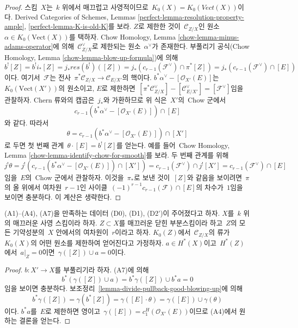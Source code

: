 \begin{proof}
스킴\  $X$는\  $k$ 위에서 매끄럽고 사영적이므로\ 
$K_0(X) = K_0(\textit{Vect}(X))$이다. Derived Categories of Schemes,
Lemmas \ref{perfect-lemma-resolution-property-ample},
\ref{perfect-lemma-K-is-old-K}를 보라. $Z$로 제한한 것이\ 
$\mathcal{C}_{Z/X}$인 원소\  $\alpha \in K_0(\text{Vect}(X))$를
택하자. Chow Homology, Lemma
\ref{chow-lemma-minus-adams-operator}에 의해\ 
$\mathcal{C}_{Z/X}^\vee$로 제한되는 원소\  $\alpha^\vee$가 존재한다.
부풀리기 공식(Chow Homology, Lemma
\ref{chow-lemma-blow-up-formula})에 의해
$$
b^![Z] = b^!i_*[Z] = j_* res(b^!)([Z]) =
j_*(c_{r - 1}(\mathcal{F}^\vee) \cap \pi^*[Z]) =
j_*(c_{r - 1}(\mathcal{F}^\vee) \cap [E])
$$
이다. 여기서\  $\mathcal{F}$는 전사\ 
$\pi^*\mathcal{C}_{Z/X} \to \mathcal{C}_{E/X'}$의 핵이다.
$b^*\alpha^\vee - [\mathcal{O}_{X'}(E)]$는\ 
$K_0(\text{Vect}(X'))$의 원소이고, $E$로 제한하면\ 
$[\pi^*\mathcal{C}_{Z/X}^\vee] - [\mathcal{C}_{E/X'}^\vee] =
[\mathcal{F}^\vee]$임을 관찰하자. Chern 류와의 캡곱은\  $j_*$와
가환하므로 위 식은\  $X'$의\  Chow 군에서
$$
c_{r - 1}(b^*\alpha^\vee - [\mathcal{O}_{X'}(E)]) \cap [E]
$$
와 같다. 따라서
$$
\theta = c_{r - 1}(b^*\alpha^\vee - [\mathcal{O}_{X'}(E)]) \cap [X']
$$
로 두면 첫 번째 관계\  $\theta \cdot [E] = b^![Z]$를 얻는다. 예를
들어\  Chow Homology, Lemma
\ref{chow-lemma-identify-chow-for-smooth}를 보라. 두 번째 관계를
위해
$$
j^!\theta = j^!(c_{r - 1}(b^*\alpha^\vee - [\mathcal{O}_{X'}(E)]) \cap [X'])
= c_{r - 1}(\mathcal{F}^\vee) \cap j^![X'] =
c_{r - 1}(\mathcal{F}^\vee) \cap [E]
$$
임을\  $E$의\  Chow 군에서 관찰하자. 이것을\  $\pi_*$로 보낸 것이\ 
$[Z]$와 같음을 보이려면\  $\pi$의 올 위에서 여차원\  $r - 1$인 사이클\ 
$(-1)^{r - 1}c_{r - 1}(\mathcal{F}) \cap [E]$의 차수가\  $1$임을
보이면 충분하다. 이 계산은 생략한다.
\end{proof}

\begin{lemma}
\label{lemma-A5-A6-imply}
(A1)--(A4), (A7)을 만족하는 데이터 (D0), (D1), (D2')이
주어졌다고 하자. $X$를\  $k$ 위의 매끄러운 사영 스킴이라 하자.
$Z \subset X$를 매끄러운 닫힌 부분스킴이라 하고\  $Z$의 모든 기약성분의\ 
$X$ 안에서의 여차원이\  $r$이라고 하자. $K_0(Z)$에서\ 
$\mathcal{C}_{Z/X}$의 류가\  $K_0(X)$의 어떤 원소를 제한하여
얻어진다고 가정하자. $a \in H^*(X)$이고\  $H^*(Z)$에서\ 
$a|_Z = 0$이면\  $\gamma([Z]) \cup a = 0$이다.
\end{lemma}

\begin{proof}
$b : X' \to X$를 부풀리기라 하자. (A7)에 의해
$$
b^*(\gamma([Z]) \cup a) = b^*\gamma([Z]) \cup b^*a = 0
$$
임을 보이면 충분하다. 보조정리\ 
\ref{lemma-divide-pullback-good-blowing-up}에 의해
$$
b^*\gamma([Z]) = \gamma(b^*[Z]) =
\gamma([E] \cdot \theta) =
\gamma([E]) \cup \gamma(\theta)
$$
이다. $b^*a$를\  $E$로 제한하면 영이고\ 
$\gamma([E]) = c^H_1(\mathcal{O}_{X'}(E))$이므로 (A4)에서 원하는
결론을 얻는다.
\end{proof}

